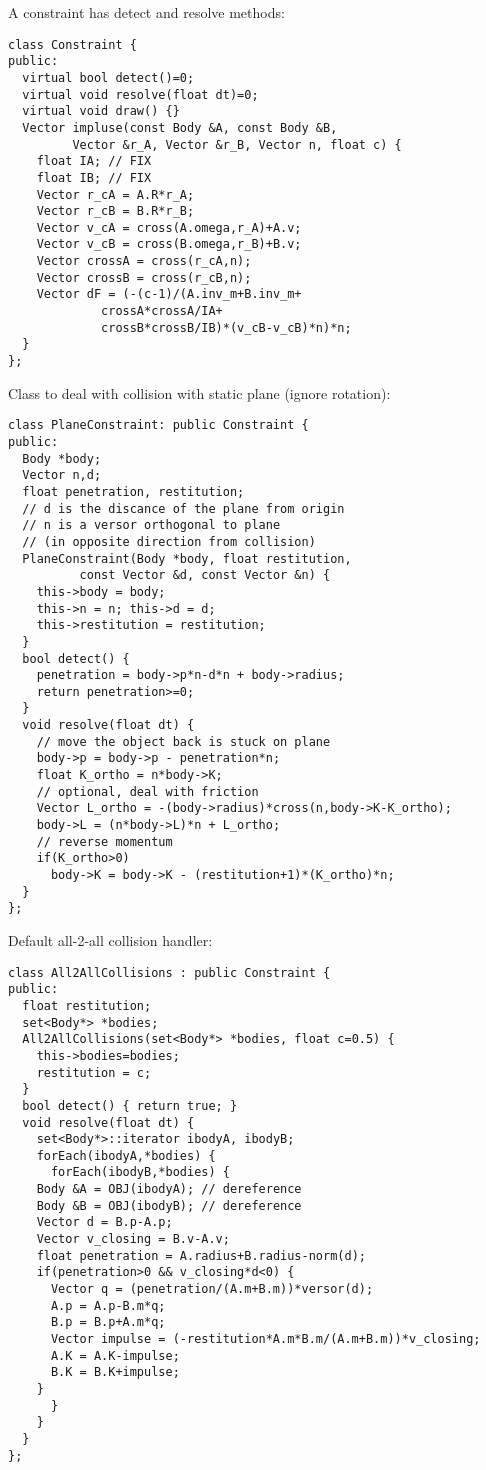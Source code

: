 \noindent
A constraint has detect and resolve methods: \begin{lstlisting}
class Constraint {
public:  
  virtual bool detect()=0;
  virtual void resolve(float dt)=0;
  virtual void draw() {}
  Vector impluse(const Body &A, const Body &B, 
		 Vector &r_A, Vector &r_B, Vector n, float c) {
    float IA; // FIX
    float IB; // FIX
    Vector r_cA = A.R*r_A;
    Vector r_cB = B.R*r_B;
    Vector v_cA = cross(A.omega,r_A)+A.v;
    Vector v_cB = cross(B.omega,r_B)+B.v;
    Vector crossA = cross(r_cA,n);
    Vector crossB = cross(r_cB,n);
    Vector dF = (-(c-1)/(A.inv_m+B.inv_m+
			 crossA*crossA/IA+
			 crossB*crossB/IB)*(v_cB-v_cB)*n)*n;
  }
};
\end{lstlisting}
\noindent
Class to deal with collision with static plane
(ignore rotation): \begin{lstlisting}
class PlaneConstraint: public Constraint {
public:
  Body *body;
  Vector n,d;
  float penetration, restitution;
  // d is the discance of the plane from origin
  // n is a versor orthogonal to plane 
  // (in opposite direction from collision)
  PlaneConstraint(Body *body, float restitution,
		  const Vector &d, const Vector &n) {
    this->body = body;
    this->n = n; this->d = d;
    this->restitution = restitution;
  }
  bool detect() {
    penetration = body->p*n-d*n + body->radius;
    return penetration>=0;
  }
  void resolve(float dt) {
    // move the object back is stuck on plane 
    body->p = body->p - penetration*n;
    float K_ortho = n*body->K;
    // optional, deal with friction 
    Vector L_ortho = -(body->radius)*cross(n,body->K-K_ortho);
    body->L = (n*body->L)*n + L_ortho;
    // reverse momentum
    if(K_ortho>0)
      body->K = body->K - (restitution+1)*(K_ortho)*n;
  }
};
\end{lstlisting}
\noindent
Default all-2-all collision handler: \begin{lstlisting}
class All2AllCollisions : public Constraint {
public:  
  float restitution;
  set<Body*> *bodies;
  All2AllCollisions(set<Body*> *bodies, float c=0.5) {
    this->bodies=bodies;
    restitution = c;
  }
  bool detect() { return true; }
  void resolve(float dt) {
    set<Body*>::iterator ibodyA, ibodyB;
    forEach(ibodyA,*bodies) {
      forEach(ibodyB,*bodies) {
	Body &A = OBJ(ibodyA); // dereference
	Body &B = OBJ(ibodyB); // dereference
	Vector d = B.p-A.p;
	Vector v_closing = B.v-A.v;
	float penetration = A.radius+B.radius-norm(d);	  
	if(penetration>0 && v_closing*d<0) {
	  Vector q = (penetration/(A.m+B.m))*versor(d);
	  A.p = A.p-B.m*q;
	  B.p = B.p+A.m*q;
	  Vector impulse = (-restitution*A.m*B.m/(A.m+B.m))*v_closing;
	  A.K = A.K-impulse;
	  B.K = B.K+impulse;
	}
      } 
    }
  }
};
\end{lstlisting}
